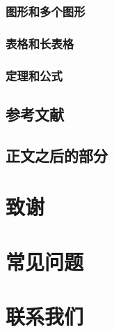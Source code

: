 \documentclass[doctor,openright]{buaathesis}
\begin{document}
		\subsection{图形和多个图形}
		\subsection{表格和长表格}
		\subsection{定理和公式}
	\newpage
	\section{参考文献}
	\section{正文之后的部分}
	
\chapter{致谢}
\cleardoublepage
%

\appendix


\chapter{常见问题}

\chapter{联系我们}
\end{document}
